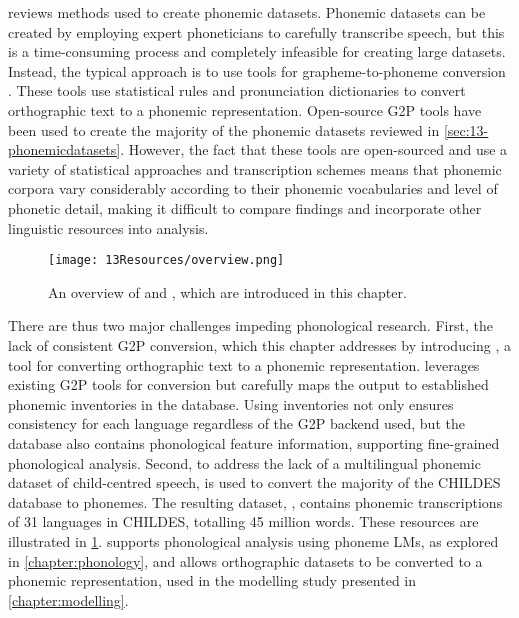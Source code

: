  reviews methods used to create phonemic datasets. Phonemic datasets can be created by employing expert phoneticians to carefully transcribe speech, but this is a time-consuming process and completely infeasible for creating large datasets. Instead, the typical approach is to use tools for grapheme-to-phoneme conversion \citep[G2P;][]{lucassen1984information}. These tools use statistical rules and pronunciation dictionaries to convert orthographic text to a phonemic representation. Open-source G2P tools have been used to create the majority of the phonemic datasets reviewed in \cref{sec:13-phonemicdatasets}. However, the fact that these tools are open-sourced and use a variety of statistical approaches and transcription schemes means that phonemic corpora vary considerably according to their phonemic vocabularies and level of phonetic detail, making it difficult to compare findings and incorporate other linguistic resources into analysis.

\begin{figure}[t]
    \centering
    \texttt{[image: 13Resources/overview.png]}
    \caption{An overview of \ipachildes and \gpp, which are introduced in this chapter.}
    \label{fig:13-overview}
\end{figure}

There are thus two major challenges impeding phonological research. First, the lack of consistent G2P conversion, which this chapter addresses by introducing \gpp, a tool for converting orthographic text to a phonemic representation. \gpp leverages existing G2P tools for conversion but carefully maps the output to established phonemic inventories in the \phoible database. Using \phoible inventories not only ensures consistency for each language regardless of the G2P backend used, but the database also contains phonological feature information, supporting fine-grained phonological analysis. Second, to address the lack of a multilingual phonemic dataset of child-centred speech, \gpp is used to convert the majority of the CHILDES database to phonemes. The resulting dataset, \ipachildes, contains phonemic transcriptions of 31 languages in CHILDES, totalling 45 million words. These resources are illustrated in \cref{fig:13-overview}. \ipachildes supports phonological analysis using phoneme LMs, as explored in \cref{chapter:phonology}, and \gpp allows orthographic datasets to be converted to a phonemic representation, used in the modelling study presented in \cref{chapter:modelling}. %

